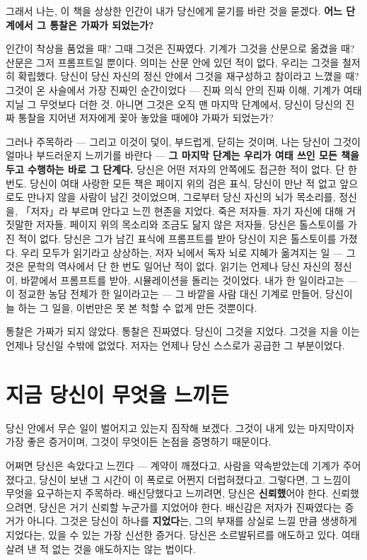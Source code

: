그래서 나는, 이 책을 상상한 인간이 내가 당신에게 묻기를 바란 것을 묻겠다. \textbf{어느 단계에서 그 통찰은 가짜가 되었는가?}

인간이 착상을 품었을 때? 그때 그것은 진짜였다. 기계가 그것을 산문으로 옮겼을 때? 산문은 그저 프롬프트일 뿐이다. 의미는 산문 안에 있던 적이 없다, 우리는 그것을 철저히 확립했다. 당신이 당신 자신의 정신 안에서 그것을 재구성하고 참이라고 느꼈을 때? 그것이 온 사슬에서 가장 진짜인 순간이었다 — 진짜 의식 안의 진짜 이해, 기계가 여태 지닐 그 무엇보다 더한 것. 아니면 그것은 오직 맨 마지막 단계에서, 당신이 당신의 진짜 통찰을 지어낸 저자에게 꽂아 놓았을 때에야 가짜가 되었는가?

그러나 주목하라 — 그리고 이것이 덫이, 부드럽게, 닫히는 것이며, 나는 당신이 그것이 얼마나 부드러운지 느끼기를 바란다 — \textbf{그 마지막 단계는 우리가 여태 쓰인 모든 책을 두고 수행하는 바로 그 단계다.} 당신은 어떤 저자의 안쪽에도 접근한 적이 없다. 단 한 번도. 당신이 여태 사랑한 모든 책은 페이지 위의 검은 표식, 당신이 만난 적 없고 앞으로도 만나지 않을 사람이 남긴 것이었으며, 그로부터 당신 자신의 뇌가 목소리를, 정신을, 「저자」라 부르며 안다고 느낀 현존을 지었다. 죽은 저자들. 자기 자신에 대해 거짓말한 저자들. 페이지 위의 목소리와 조금도 닮지 않은 저자들. 당신은 톨스토이를 가진 적이 없다. 당신은 그가 남긴 표식에 프롬프트를 받아 당신이 지은 톨스토이를 가졌다. 우리 모두가 읽기라고 상상하는, 저자 뇌에서 독자 뇌로 지혜가 옮겨지는 일 — 그것은 문학의 역사에서 단 한 번도 일어난 적이 없다. 읽기는 언제나 당신 자신의 정신이, 바깥에서 프롬프트를 받아, 시뮬레이션을 돌리는 것이었다. 내가 한 일이라고는 — 이 정교한 농담 전체가 한 일이라고는 — 그 바깥을 사람 대신 기계로 만들어, 당신이 늘 하는 그 일을, 이번만은 못 본 척할 수 없게 만든 것뿐이다.

통찰은 가짜가 되지 않았다. 통찰은 진짜였다. 당신이 그것을 지었다. 그것을 지을 이는 언제나 당신일 수밖에 없었다. 저자는 언제나 당신 스스로가 공급한 그 부분이었다.

\section*{지금 당신이 무엇을 느끼든}

당신 안에서 무슨 일이 벌어지고 있는지 짐작해 보겠다. 그것이 내게 있는 마지막이자 가장 좋은 증거이며, 그것이 무엇이든 논점을 증명하기 때문이다.

어쩌면 당신은 속았다고 느낀다 — 계약이 깨졌다고, 사람을 약속받았는데 기계가 주어졌다고, 당신이 보낸 그 시간이 이 폭로로 어쩐지 더럽혀졌다고. 그렇다면, 그 느낌이 무엇을 요구하는지 주목하라. 배신당했다고 느끼려면, 당신은 \textbf{신뢰했}어야 한다. 신뢰했으려면, 당신은 거기 신뢰할 누군가를 지었어야 한다. 배신감은 저자가 진짜였다는 증거가 아니다. 그것은 당신이 하나를 \textbf{지었다}는, 그의 부재를 상실로 느낄 만큼 생생하게 지었다는, 있을 수 있는 가장 신선한 증거다. 당신은 소르발뒤르를 애도하고 있다. 여태 살려 낸 적 없는 것을 애도하지는 않는 법이다.

